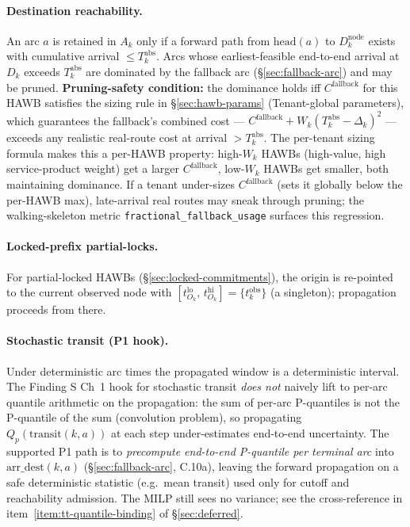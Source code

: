 \documentclass[11pt,a4paper]{article}
\theoremstyle{definition}
\begin{document}
\paragraph{Destination reachability.}
An arc $a$ is retained in $A_k$ only if a forward path from $\text{head}(a)$
to $D_k^{\text{node}}$ exists with cumulative arrival $\leq T_k^{\text{abs}}$.
Arcs whose earliest-feasible end-to-end arrival at $D_k$ exceeds
$T_k^{\text{abs}}$ are dominated by the fallback arc
(\S\ref{sec:fallback-arc}) and may be pruned. \textbf{Pruning-safety
condition:} the dominance holds iff $C^{\text{fallback}}$ for this HAWB
satisfies the sizing rule in \S\ref{sec:hawb-params} (Tenant-global
parameters), which guarantees the fallback's combined cost ---
$C^{\text{fallback}} + W_k (T_k^{\text{abs}} - \Delta_k)^2$ --- exceeds
any realistic real-route cost at arrival $> T_k^{\text{abs}}$. The
per-tenant sizing formula makes this a per-HAWB property:
high-$W_k$ HAWBs (high-value, high service-product weight) get a larger
$C^{\text{fallback}}$, low-$W_k$ HAWBs get smaller, both maintaining
dominance. If a tenant under-sizes $C^{\text{fallback}}$ (sets it
globally below the per-HAWB max), late-arrival real routes may sneak
through pruning; the walking-skeleton metric
\texttt{fractional\_fallback\_usage} surfaces this regression.

\paragraph{Locked-prefix partial-locks.}
For partial-locked HAWBs (\S\ref{sec:locked-commitments}), the origin is
re-pointed to the current observed node with $[t^{\text{lo}}_{O_k},\,
t^{\text{hi}}_{O_k}] = \{t_k^{\text{obs}}\}$ (a singleton); propagation
proceeds from there.

\paragraph{Stochastic transit (P1 hook).}
Under deterministic arc times the propagated window is a deterministic
interval. The Finding S Ch~1 hook for stochastic transit \emph{does not}
naively lift to per-arc quantile arithmetic on the propagation: the sum of
per-arc P-quantiles is not the P-quantile of the sum (convolution
problem), so propagating $Q_p(\text{transit}(k, a))$ at each step
under-estimates end-to-end uncertainty. The supported P1 path is to
\emph{precompute end-to-end P-quantile per terminal arc} into
$\text{arr\_dest}(k, a)$ (\S\ref{sec:fallback-arc}, C.10a), leaving the
forward propagation on a safe deterministic statistic (e.g.\ mean transit)
used only for cutoff and reachability admission. The MILP still sees no
variance; see the cross-reference in
item~\ref{item:tt-quantile-binding} of \S\ref{sec:deferred}.
\end{document}
